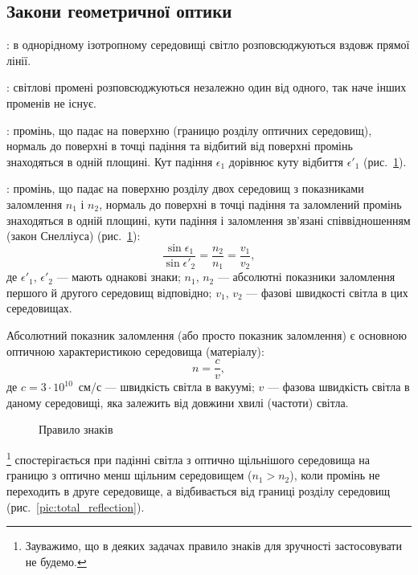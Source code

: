 \subsection*{Закони геометричної оптики}


: в однорідному ізотропному середовищі світло розповсюджуються вздовж прямої лінії.

: світлові промені розповсюджуються незалежно один від одного, так наче інших променів не існує.

: промінь, що падає на поверхню (границю розділу оптичних
середовищ), нормаль до поверхні в точці падіння та відбитий від поверхні промінь знаходяться в одній площині. Кут падіння $\epsilon_1$ дорівнює куту
відбиття $\epsilon'_1$ (рис.~\ref{pic:ReflAndRefr}).

: промінь, що падає на поверхню розділу двох середовищ з
показниками заломлення $n_1$ і $n_2$, нормаль до поверхні в точці падіння та
заломлений промінь знаходяться в одній площині, кути падіння і
заломлення зв’язані співвідношенням (закон Снелліуса) (рис.~\ref{pic:ReflAndRefr}):
\begin{equation}\label{eq:Snell}
	\frac{\sin\epsilon_1}{\sin\epsilon'_2} = \frac{n_2}{n_1} = \frac{v_1}{v_2},
\end{equation}
де $\epsilon'_1$, $\epsilon'_2$ --- мають однакові знаки; $n_1$, $n_2$ --- абсолютні показники заломлення першого й другого середовищ відповідно; $v_1$, $v_2$ --- фазові швидкості світла в цих середовищах.

Абсолютний показник заломлення (або просто показник заломлення)
є основною оптичною характеристикою середовища (матеріалу):
\begin{equation}\label{eq:n}
	n = \frac{c}{v},
\end{equation}
де $c = 3\cdot 10^{10}$~см/с --- швидкість світла в вакуумі; $v$ --- фазова швидкість світла в даному середовищі, яка залежить від довжини хвилі (частоти) світла.

\begin{figure}[!h]\centering
    
	\caption{Правило знаків}
	\label{pic:ReflAndRefr}
\end{figure}

\footnote{Зауважимо, що в деяких задачах правило знаків для зручності застосовувати не будемо.} спостерігається при падінні
світла з оптично щільнішого середовища на границю з оптично менш
щільним середовищем ($n_1 > n_2$), коли промінь не переходить в друге
середовище, а відбивається від границі розділу середовищ (рис.~\ref{pic:total_reflection}).

